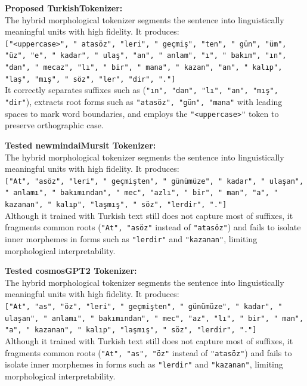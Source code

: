 \vspace{1em}

\textbf{Proposed TurkishTokenizer:} \\
The hybrid morphological tokenizer segments the sentence into linguistically meaningful units with high fidelity. It produces: \\
\texttt{["<uppercase>", " atasöz", "leri", " geçmiş", "ten", " gün", "üm", "üz", "e", " kadar", " ulaş", "an", " anlam", "ı", " bakım", "ın", "dan", " mecaz", "lı", " bir", " mana", " kazan", "an", " kalıp", "laş", "mış", " söz", "ler", "dir", "."]} \\
It correctly separates suffixes such as (\texttt{"ın", "dan", "lı", "an", "mış", "dir"}), extracts root forms such as \texttt{"atasöz", "gün", "mana"} with leading spaces to mark word boundaries, and employs the \texttt{"<uppercase>"} token to preserve orthographic case.

\vspace{1em}

\textbf{Tested newmindaiMursit Tokenizer:} \\
The hybrid morphological tokenizer segments the sentence into linguistically meaningful units with high fidelity. It produces: \\
\texttt{["At", "asöz", "leri", " geçmişten", " günümüze", " kadar", " ulaşan", " anlamı", " bakımından", " mec", "azlı", " bir", " man", "a", " kazanan", " kalıp", "laşmış", " söz", "lerdir", "."]} \\
Although it trained with Turkish text still does not capture most of suffixes, it fragments common roots (\texttt{"At", "asöz"} instead of \texttt{"atasöz"}) and fails to isolate inner morphemes in forms such as \texttt{"lerdir"} and \texttt{"kazanan"}, limiting morphological interpretability.

\vspace{1em}

\textbf{Tested cosmosGPT2 Tokenizer:} \\
The hybrid morphological tokenizer segments the sentence into linguistically meaningful units with high fidelity. It produces: \\
\texttt{["At", "as", "öz", "leri", " geçmişten", " günümüze", " kadar", " ulaşan", " anlamı", " bakımından", " mec", "az", "lı", " bir", " man", "a", " kazanan", " kalıp", "laşmış", " söz", "lerdir", "."]} \\
Although it trained with Turkish text still does not capture most of suffixes, it fragments common roots (\texttt{"At", "as", "öz"} instead of \texttt{"atasöz"}) and fails to isolate inner morphemes in forms such as \texttt{"lerdir"} and \texttt{"kazanan"}, limiting morphological interpretability.

